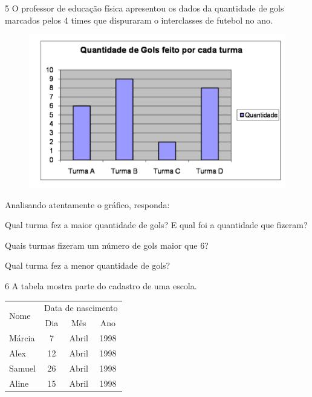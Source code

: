 \num{5} O professor de educação física apresentou os dados da quantidade de
gols marcados pelos 4 times que dispuraram o interclasses de futebol no
ano.

\begin{figure}[htpb!]
\includegraphics[width=.5\textwidth]{./imgs/mat13.png}
\end{figure}

Analisando atentamente o gráfico, responda:

\begin{escolha}
\item
  Qual turma fez a maior quantidade de gols? E qual foi a quantidade que fizeram?


\item
  Quais turmas fizeram um número de gols maior que 6?


\item
  Qual turma fez a menor quantidade de gols?

\end{escolha}

\num{6} A tabela mostra parte do cadastro de uma escola.

\begin{tabular}{l|ccc}
\hline
\multirow{2}{*}{Nome} & \multicolumn{3}{l}{Data de nascimento} \\ \cline{2-4} 
 & \multicolumn{1}{c|}{Dia} & \multicolumn{1}{c|}{Mês} & Ano \\ \hline
Márcia & \multicolumn{1}{c|}{7} & \multicolumn{1}{c|}{Abril} & 1998 \\ \hline
Alex & \multicolumn{1}{c|}{12} & \multicolumn{1}{c|}{Abril} & 1998 \\ \hline
Samuel & \multicolumn{1}{c|}{26} & \multicolumn{1}{c|}{Abril} & 1998 \\ \hline
Aline & \multicolumn{1}{c|}{15} & \multicolumn{1}{c|}{Abril} & 1998 \\ \hline
\end{tabular}

